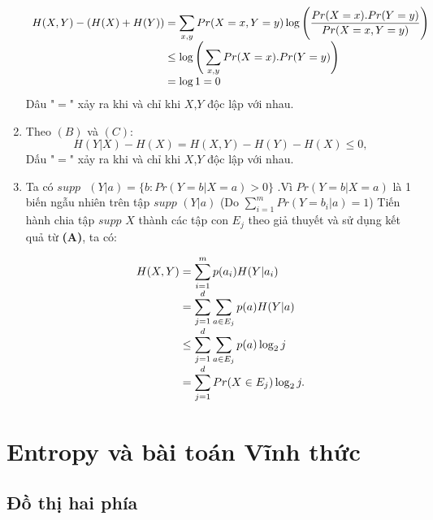 \documentclass[a4paper, 12pt]{report}
\begin{document}
\begin{enumerate}[label=(\Alph*)]
\begin{equation*}
\begin{array}{l@{}l}
H(X,Y) - (H(X) + H(Y)) 
	&{}= \displaystyle \sum_{x,y}Pr(X=x,Y=y)\log\Bigg(\frac{Pr(X=x).Pr(Y=y)}{Pr(X=x,Y=y)}\Bigg) \\
	&{}\leq \log \Bigg( \displaystyle \sum_{x,y}Pr(X=x).Pr(Y=y)\Bigg)\\
	&{}= \log 1 =0 
\end{array}
\end{equation*}
Dâu "$=$" xảy ra khi và chỉ khi $X$,$Y$ độc lập với nhau.
\item Theo $(B)$ và $(C)$:
\begin{equation*}
	H(Y|X) - H(X) = H(X,Y) - H(Y) - H(X) \leq 0,
\end{equation*}
Dấu "$=$" xảy ra  khi và chỉ khi $X$,$Y$ độc lập với nhau.

\item Ta có $supp\textrm{ }(Y|a) = \{b: Pr(Y=b|X=a) > 0 \}$ .Vì $Pr(Y=b|X=a)$ là 1 biến ngẫu nhiên trên tập $supp$ $(Y|a)$ (Do $\displaystyle \sum_{i=1}^{m}Pr(Y=b_{i}|a) =1$) Tiến hành chia tập $supp$ $X$ thành các tập con $E_{j}$ theo giả thuyết và sử dụng kết quả từ \textbf{(A)}, ta có:

\begin{equation*}
\begin{array}{l@{}l}
H(X,Y)
	&{} = \displaystyle \sum_{i=1}^{m}p(a_{i})H(Y|a_{i}) \\
	&{}= \displaystyle \sum _{j=1}^{d}\sum_{a \in E_{j}}p(a)H(Y|a) \\
	&{} \leq \displaystyle \sum _{j=1}^{d}\sum_{a \in E_{j}}p(a)\log_{2}j \\
	&{} = \displaystyle \sum_{j=1}^{d}Pr(X \in E_{j})\log_{2}j.
\end{array}
\end{equation*}
\end{enumerate}




\chapter{Entropy và bài toán Vĩnh thức}


\section{Đồ thị hai phía}
\end{document}
